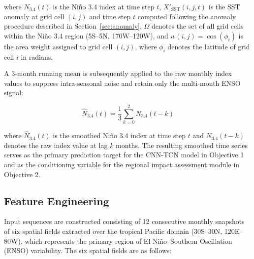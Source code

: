 \noindent where $N_{3.4}(t)$ is the Ni\~{n}o 3.4 index at time step $t$, $X'_{\text{SST}}(i,j,t)$ is the SST anomaly at grid cell $(i,j)$ and time step $t$ computed following the anomaly procedure described in Section~\ref{sec:anomaly}, $\Omega$ denotes the set of all grid cells within the Ni\~{n}o 3.4 region (5\degree S--5\degree N, 170\degree W--120\degree W), and $w(i,j) = \cos(\phi_i)$ is the area weight assigned to grid cell $(i,j)$, where $\phi_i$ denotes the latitude of grid cell $i$ in radians.

A 3-month running mean is subsequently applied to the raw monthly index values to suppress intra-seasonal noise and retain only the multi-month ENSO signal:

\begin{equation}
    \hat{N}_{3.4}(t) = \frac{1}{3} \sum_{k=0}^{2} N_{3.4}(t-k)
\end{equation}

\noindent where $\hat{N}_{3.4}(t)$ is the smoothed Ni\~{n}o 3.4 index at time step $t$ and $N_{3.4}(t-k)$ denotes the raw index value at lag $k$ months. The resulting smoothed time series serves as the primary prediction target for the CNN-TCN model in Objective 1 and as the conditioning variable for the regional impact assessment module in Objective 2.

\subsection{Feature Engineering}
\label{sec:feature-engineering}
Input sequences are constructed consisting of 12 consecutive monthly snapshots of six spatial fields extracted over the tropical Pacific domain (30\degree S--30\degree N, 120\degree E--80\degree W), which represents the primary region of El Ni\~{n}o--Southern Oscillation (ENSO) variability. The six spatial fields are as follows:

